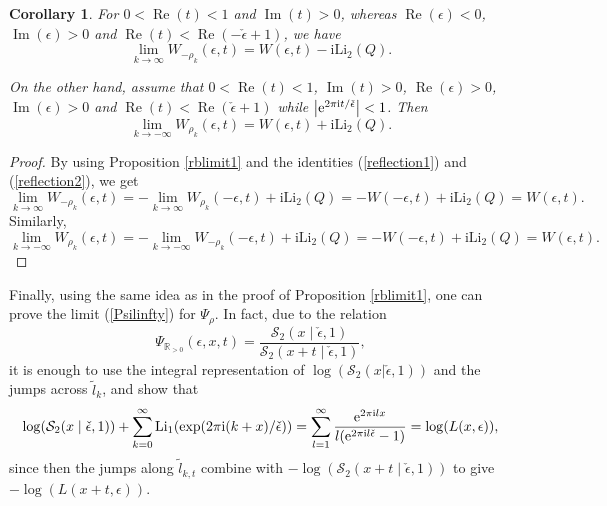 \documentclass[pdftex]{sigma}
\numberwithin{equation}{section}
\newtheorem{Corollary}[Theorem]{Corollary}
\begin{document}
\begin{Corollary}
For $0<\operatorname{Re}(t)<1$ and $\operatorname{Im}(t)>0$, whereas $\operatorname{Re}(\epsilon)<0$, $\operatorname{Im}(\epsilon)>0$ and $\operatorname{Re}(t) < \operatorname{Re} (-\check{\epsilon}+1)$, we have
\begin{equation*}
 \lim_{k\to \infty}W_{-\rho_k}(\epsilon,t)=W(\epsilon,t)-\mathrm{i}\mathrm{Li}_2(Q).
\end{equation*}

On the other hand, assume that $0<\operatorname{Re}(t)<1$, $\operatorname{Im}(t)>0$, $\operatorname{Re}(\epsilon)>0$, $\operatorname{Im}(\epsilon)>0$ and $\operatorname{Re} (t) < \operatorname{Re} (\check{\epsilon}+1)$ while $\big|{\rm e}^{2\pi \mathrm{i} t/\check\epsilon}\big|<1$. Then
\begin{equation*}
\lim_{k\to -\infty}W_{\rho_k}(\epsilon,t)=W(\epsilon,t)+\mathrm{i}\mathrm{Li}_2(Q).
\end{equation*}
\end{Corollary}
\begin{proof}
By using Proposition \ref{rblimit1} and the identities (\ref{reflection1}) and (\ref{reflection2}), we get
\begin{equation*}
 \lim_{k\to \infty}W_{-\rho_k}(\epsilon,t)=- \lim_{k\to \infty}W_{\rho_k}(-\epsilon,t)+\mathrm{i}\mathrm{Li}_2(Q)
 =-W(-\epsilon,t)+\mathrm{i}\mathrm{Li}_2(Q)
 =W(\epsilon,t).
\end{equation*}
Similarly,
\begin{equation*}
 \lim_{k\to -\infty}W_{\rho_k}(\epsilon,t)=- \lim_{k\to -\infty}W_{-\rho_k}(-\epsilon,t)+\mathrm{i}\mathrm{Li}_2(Q)
 =-W(-\epsilon,t)+\mathrm{i}\mathrm{Li}_2(Q)
 =W(\epsilon,t).\tag*{\qed}
\end{equation*}\renewcommand{\qed}{}
\end{proof}

Finally, using the same idea as in the proof of Proposition \ref{rblimit1}, one can prove the limit (\ref{Psilinfty}) for $\Psi_{\rho}$. In fact, due to the relation
\begin{equation*}
 \Psi_{\mathbb{R}_{>0}}(\epsilon,x,t)=\frac{\mathcal{S}_2(x\mid \check\epsilon,1)}{\mathcal{S}_2(x+t\mid \check\epsilon,1)},
\end{equation*}
it is enough to use the integral representation of $\log(\mathcal{S}_2(x|\check\epsilon,1))$ and the jumps across $\widetilde{l}_k$, and show that
\begin{equation}\label{S2l}
 \log(\mathcal{S}_2(x\mid \check\epsilon,1))+\sum_{k=0}^{\infty}\mathrm{Li}_1(\exp(2\pi \mathrm{i}(k+x)/\check\epsilon))=\sum_{l=1}^{\infty}\frac{{\rm e}^{2\pi \mathrm{i} lx}}{l({\rm e}^{2\pi \mathrm{i} l\check\epsilon}-1)}=\log(L(x,\epsilon)),
\end{equation}
since then the jumps along $\widetilde{l}_{k,t}$ combine with $-\log(\mathcal{S}_2(x+t\mid \check\epsilon,1))$ to give $-\log(L(x+t,\epsilon))$.
\end{document}
